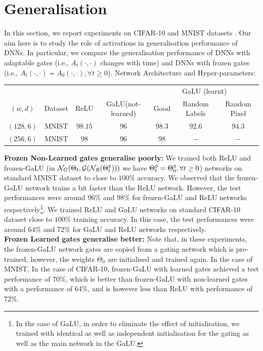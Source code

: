 \section{Generalisation}\label{sec:generalisation}
In this section, we report experiments on CIFAR-10 and MNIST  datasets . Our aim here is to study the role of activations in generalisation performance of DNNs. In particular, we compare the generalisation performance of DNNs with adaptable gates (i.e., $A_t(\cdot,\cdot)$ changes with time) and DNNs with frozen gates (i.e., $A_t(\cdot,\cdot)=A_0(\cdot,\cdot),\forall t\geq 0$).
Network Architecture and Hyper-parameters:\hfill\\
\begin{table}
\begin{tabular}{|c|c|c|c|c|c|c|}\hline
&&&&\multicolumn{3}{c|}{GaLU (learnt)}\\\cline{5-7}
$(w,d)$	&Dataset		&ReLU		&GaLU(not-learned) 		&Good 		&Random Labels 	&Random Pixel\\\hline
$(128,6)$	& MNIST 		& $98.15$ 		&$96$ 		&$98.3$		&$92.6$			&$94.3$\\\hline
$(256,6)$	& MNIST 		& $98$ 		&$96$ 		&$98$		&$-$			&$-$\\\hline
\end{tabular}
\end{table}
\textbf{Frozen Non-Learned gates generalise poorly:} We trained both ReLU and frozen-GaLU (in $\mathcal{N}_G(\Theta_t,\mathcal{G}(\mathcal{N}_R({\Theta}^g_t)))$ we have ${\Theta}^g_t={\Theta}^g_0,\forall t\geq 0$) networks on standard MNIST dataset to close to $100\%$ accuracy. We observed that the frozen-GaLU network trains a bit faster than the ReLU network. However, the test performances were around $96\%$ and  $98\%$ for frozen-GaLU and ReLU networks respectively\footnote{In the case of GaLU, in order to eliminate the effect of initialisation, we trained with identical as well as independent initialisation for the gating as well as the main network in the GaLU. }. We trained ReLU and GaLU networks on standard CIFAR-10 dataset close to $100\%$ training accuracy. In this case, the test performances were around $64\%$ and $72\%$ for GaLU and ReLU networks respectively.\hfill\\
\textbf{Frozen Learned gates generalise better:} Note that, in these experiments, the frozen-GaLU network gates are copied from a gating network which is pre-trained, however, the weights $\Theta_0$ are initialised and trained again.  In the case of MNIST, 
In the case of CIFAR-10, frozen-GaLU with learned gates achieved a test performance of $70\%$, which is better than frozen-GaLU with non-learned gates with a performance of  $64\%$, and is however less than ReLU with performance of $72\%$. \hfill\\
